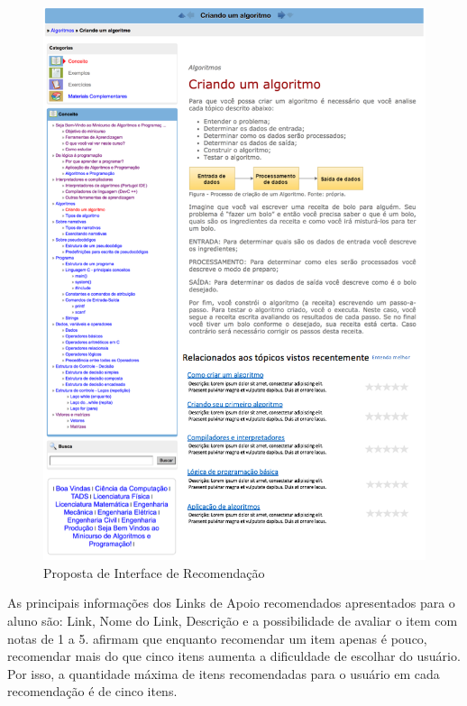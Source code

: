 \begin{figure}[htb]
  \caption{\label{fig:adaptweb-proposta-recomendacao}Proposta de Interface de Recomendação}
  \begin{center}
      \includegraphics[scale=1.0]{./Figuras/recomendacoes_v2.png}
  \end{center}
\end{figure}

As principais informações dos Links de Apoio recomendados apresentados para o aluno são: Link, Nome do Link, Descrição e a possibilidade de avaliar o item
com notas de 1 a 5.  afirmam que enquanto recomendar um item apenas é pouco, recomendar
mais do que cinco itens aumenta a dificuldade de escolhar do usuário. Por isso, a quantidade máxima de itens recomendadas
para o usuário em cada recomendação é de cinco itens.

